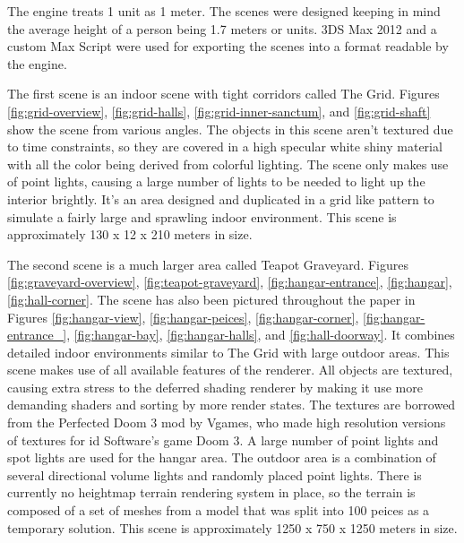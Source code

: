 \documentclass[12pt]{ucthesis}
\begin{document}
The engine treats 1 unit as 1 meter.
The scenes were designed keeping in mind the average height of a person being 1.7 meters or units.
3DS Max 2012 and a custom Max Script were used for exporting the scenes into a format readable by the engine.

The first scene is an indoor scene with tight corridors called The Grid.
Figures \ref{fig:grid-overview}, \ref{fig:grid-halls}, \ref{fig:grid-inner-sanctum}, and \ref{fig:grid-shaft} show the scene from various angles.
The objects in this scene aren't textured due to time constraints, so they are covered in a high specular white shiny material with all the color being derived from colorful lighting.
The scene only makes use of point lights, causing a large number of lights to be needed to light up the interior brightly.
It's an area designed and duplicated in a grid like pattern to simulate a fairly large and sprawling indoor environment.
This scene is approximately 130 x 12 x 210 meters in size.

The second scene is a much larger area called Teapot Graveyard.
Figures \ref{fig:graveyard-overview}, \ref{fig:teapot-graveyard}, \ref{fig:hangar-entrance}, \ref{fig:hangar}, \ref{fig:hall-corner}.
The scene has also been pictured throughout the paper in Figures \ref{fig:hangar-view}, \ref{fig:hangar-peices}, \ref{fig:hangar-corner}, \ref{fig:hangar-entrance_}, \ref{fig:hangar-bay}, \ref{fig:hangar-halls}, and \ref{fig:hall-doorway}.
It combines detailed indoor environments similar to The Grid with large outdoor areas.
This scene makes use of all available features of the renderer.
All objects are textured, causing extra stress to the deferred shading renderer by making it use more demanding shaders and sorting by more render states.
The textures are borrowed from the Perfected Doom 3 mod by Vgames, who made high resolution versions of textures for id Software's game Doom 3.\cite{Perf-Doom3}
A large number of point lights and spot lights are used for the hangar area.
The outdoor area is a combination of several directional volume lights and randomly placed point lights.
There is currently no heightmap terrain rendering system in place, so the terrain is composed of a set of meshes from a model that was split into 100 peices as a temporary solution.
This scene is approximately 1250 x 750 x 1250 meters in size.
\end{document}
